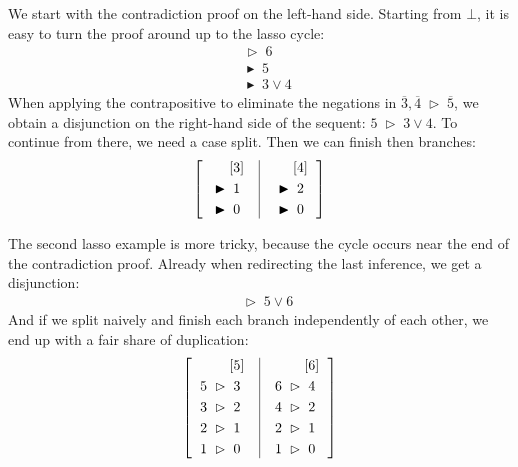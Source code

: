 \documentclass[withtimes,a4paper,12pt]{easychair}
\let\B=\overline
\newcommand\have{\mathrel{\;\vartriangleright\;}}
\newcommand\hence{\mathrel{\;\blacktriangleright\;}}
\begin{document}
We start with the contradiction proof on the left-hand side. Starting from
$\bot$, it is easy to turn the proof around up to the lasso cycle:
%
\begin{align*}
& \have 6 \\
& \hence 5 \\
& \hence 3 \lor 4
\end{align*}
%
When applying the contrapositive to eliminate the negations in $\B 3, \B 4 \have
\B 5$, we obtain a disjunction on the right-hand side of the sequent: $5 \have 3
\lor 4$. To continue from there, we need a case split. Then we can finish then
branches:
%
\[\left[\begin{tabular}{l|l} %
    $\begin{aligned}[t]
      [&3] \\
      \hence {} & 1 \\
      \hence {} & 0
    \end{aligned}$\enskip\hbox{}&\enskip
    $\begin{aligned}[t] 
      [&4] \\
      \hence {} & 2 \\
      \hence {} & 0
    \end{aligned}$
  \end{tabular}\right]\]

The second lasso example is more tricky, because the cycle occurs near the end
of the contradiction proof. Already when redirecting the last inference, we get
a disjunction:
%
\begin{align*}
& \have 5 \lor 6
\end{align*}
%
And if we split naively and finish each branch independently of each other,
we end up with a fair share of duplication:
\pagebreak[3]
\[\left[\begin{tabular}{l|l} %
    $\begin{aligned}[t]
      [&5] \\
      5 \have {} & 3 \\
      3 \have {} & 2 \\
      2 \have {} & 1 \\
      1 \have {} & 0 \\
    \end{aligned}$\enskip\hbox{}&\enskip
    $\begin{aligned}[t] 
      [&6] \\
      6 \have {} & 4 \\
      4 \have {} & 2 \\
      2 \have {} & 1 \\
      1 \have {} & 0 \\
    \end{aligned}$
  \end{tabular}\right]\]
\end{document}
